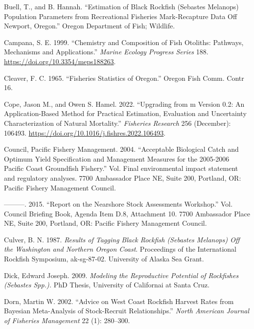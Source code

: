 \documentclass[11pt,
  english,
  letterpaper,
]{article}
\newlength{\cslhangindent}
\newenvironment{CSLReferences}[2] %
 {%
  \setlength{\parindent}{0pt}
  \ifodd #1 \everypar{\setlength{\hangindent}{\cslhangindent}}\ignorespaces\fi
  \ifnum #2 > 0
  \setlength{\parskip}{#2\baselineskip}
  \fi
 }%
 {}
\begin{document}
\begin{CSLReferences}{1}{0}
\leavevmode{}%
Buell, T., and B. Hannah. {``Estimation of Black Rockfish (Sebastes Melanops) Population Parameters from Recreational Fisheries Mark-Recapture Data Off Newport, Oregon.''} Oregon Department of Fish; Wildlife.

\leavevmode{}%
Campana, S. E. 1999. {``Chemistry and Composition of Fish Otoliths: Pathways, Mechanisms and Applications.''} \emph{Marine Ecology Progress Series} 188. \url{https://doi.org/10.3354/meps188263}.

\leavevmode{}%
Cleaver, F. C. 1965. {``Fisheries Statistics of Oregon.''} Oregon Fish Comm. Contr 16.

\leavevmode{}%
Cope, Jason M., and Owen S. Hamel. 2022. {``Upgrading from m Version 0.2: An Application-Based Method for Practical Estimation, Evaluation and Uncertainty Characterization of Natural Mortality.''} \emph{Fisheries Research} 256 (December): 106493. \url{https://doi.org/10.1016/j.fishres.2022.106493}.

\leavevmode{}%
Council, Pacific Fishery Management. 2004. {``Acceptable Biological Catch and Optimum Yield Specification and Management Measures for the 2005-2006 Pacific Coast Groundfish Fishery.''} Vol. Final environmental impact statement and regulatory analyses. 7700 Ambassador Place NE, Suite 200, Portland, OR: Pacific Fishery Management Council.

\leavevmode{}%
---------. 2015. {``Report on the Nearshore Stock Assessments Workshop.''} Vol. Council Briefing Book, Agenda Item D.8, Attachment 10. 7700 Ambassador Place NE, Suite 200, Portland, OR: Pacific Fishery Management Council.

\leavevmode{}%
Culver, B. N. 1987. \emph{Results of Tagging Black Rockfish (Sebastes Melanops) Off the Washington and Northern Oregon Coast}. Proceedings of the International Rockfish Symposium, ak-sg-87-02. University of Alaska Sea Grant.

\leavevmode{}%
Dick, Edward Joseph. 2009. \emph{Modeling the {Reproductive} {Potential} of {Rockfishes} (\emph{Sebastes} {Spp}.).} PhD Thesis, University of Californai at Santa Cruz.

\leavevmode{}%
Dorn, Martin W. 2002. {``Advice on {West} {Coast} Rockfish Harvest Rates from {B}ayesian Meta-Analysis of Stock-Recruit Relationships.''} \emph{North American Journal of Fisheries Management} 22 (1): 280--300.


\end{CSLReferences}
\end{document}
